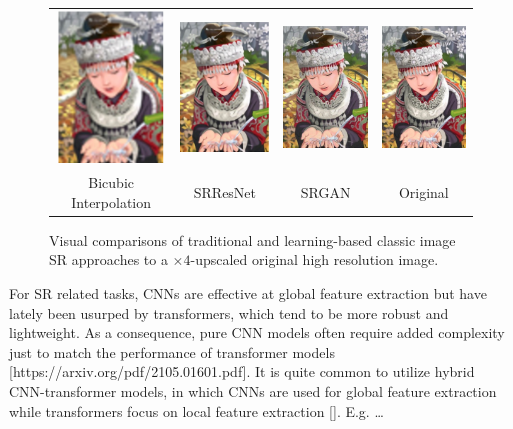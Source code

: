 \documentclass{article}
\begin{document}
\begin{figure}
    \centering
    \begin{tabular}{c c c c}
        \includegraphics[width=80pt]{bicubic.png} & \includegraphics[width=80pt]{srresnet.png} & \includegraphics[width=80pt]{srgan.png} & \includegraphics[width=80pt]{original.png} \\
        \small Bicubic Interpolation              & \small SRResNet                            & \small SRGAN                            & \small Original
    \end{tabular}

    \caption{Visual comparisons of traditional and learning-based classic image SR approaches to a $\times 4$-upscaled original high resolution image.}\label{fig:example}
\end{figure}

For SR related tasks, CNNs are effective at global feature extraction but have lately been usurped by transformers, which tend to be more robust and lightweight. As a consequence, pure CNN models often require added complexity just to match the performance of transformer models [https://arxiv.org/pdf/2105.01601.pdf]. It is quite common to utilize hybrid CNN-transformer models, in which CNNs are used for global feature extraction while transformers focus on local feature extraction []. E.g. …
\end{document}
